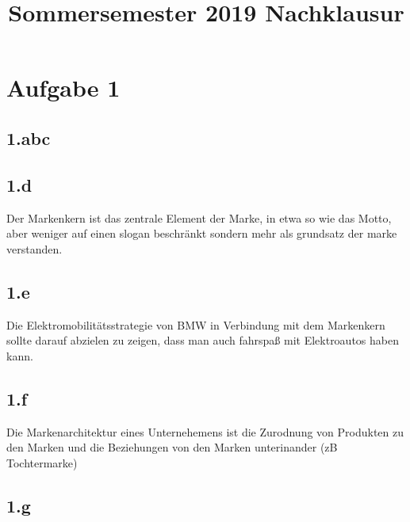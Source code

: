 

\title{Sommersemester 2019 Nachklausur}
\maketitle



\section{Aufgabe 1}
\subsection{1.abc}

\subsection{1.d}
    Der Markenkern ist das zentrale Element der Marke, in etwa so wie das Motto, aber weniger auf einen slogan beschränkt sondern mehr als grundsatz der marke verstanden.

\subsection{1.e}
    Die Elektromobilitätsstrategie von BMW in Verbindung mit dem Markenkern sollte darauf abzielen zu zeigen, dass man auch fahrspaß mit Elektroautos haben kann.

\subsection{1.f}
    Die Markenarchitektur eines Unternehemens ist die Zurodnung von Produkten zu den Marken und die Beziehungen von den Marken unterinander (zB Tochtermarke)

\subsection{1.g}
    
